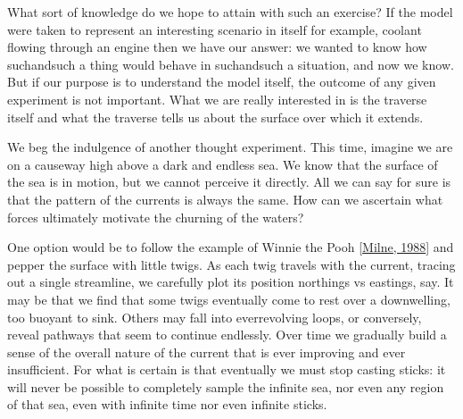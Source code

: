 \documentclass[letterpaper,10pt,english]{jupyterBook}
\begin{document}
\sphinxAtStartPar
What sort of knowledge do we hope to attain with such an exercise? If the model were taken to represent an interesting scenario in itself \sphinxhyphen{} for example, coolant flowing through an engine \sphinxhyphen{} then we have our answer: we wanted to know how such\sphinxhyphen{}and\sphinxhyphen{}such a thing would behave in such\sphinxhyphen{}and\sphinxhyphen{}such a situation, and now we know. But if our purpose is to understand the model itself, the outcome of any given experiment is not important. What we are really interested in is the traverse itself \sphinxhyphen{} and what the traverse tells us about the surface over which it extends.

\sphinxAtStartPar
We beg the indulgence of another thought experiment. This time, imagine we are on a causeway high above a dark and endless sea. We know that the surface of the sea is in motion, but we cannot perceive it directly. All we can say for sure is that the pattern of the currents is always the same. How can we ascertain what forces ultimately motivate the churning of the waters?

\sphinxAtStartPar
One option would be to follow the example of Winnie the Pooh {[}\hyperlink{cite.references:id690}{Milne, 1988}{]} and pepper the surface with little twigs. As each twig travels with the current, tracing out a single streamline, we carefully plot its position \sphinxhyphen{} northings vs eastings, say. It may be that we find that some twigs eventually come to rest over a downwelling, too buoyant to sink. Others may fall into ever\sphinxhyphen{}revolving loops, or conversely, reveal pathways that seem to continue endlessly. Over time we gradually build a sense of the overall nature of the current that is ever improving \sphinxhyphen{} and ever insufficient. For what is certain is that eventually we must stop casting sticks: it will never be possible to completely sample the infinite sea, nor even any region of that sea, even with infinite time \sphinxhyphen{} nor even infinite sticks.
\end{document}
